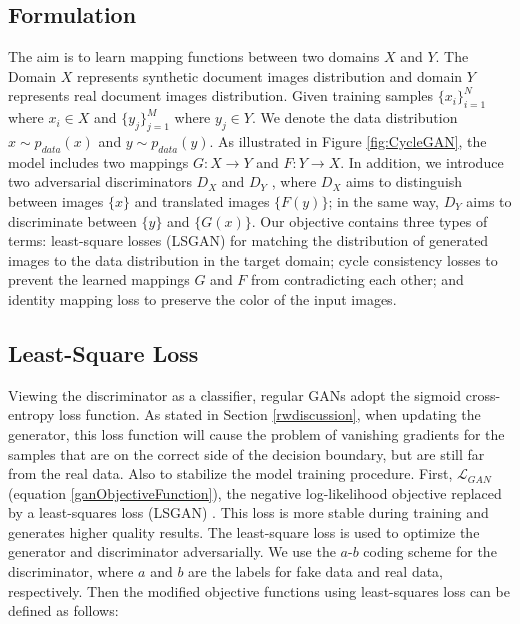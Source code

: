\subsection{Formulation}


The aim is to learn mapping functions between two domains $X$ and $Y$. The Domain $X$ represents synthetic document images distribution and domain $Y$ represents real document images distribution. Given training samples $\{x_i\}_{i=1}^{N}$ where $x_i \in X$ and  $\{y_j\}_{j=1}^{M}$ where $y_j \in Y$. We denote the data distribution $x \sim p_{data}(x)$  and $y \sim p_{data}(y)$. As illustrated in Figure \ref{fig:CycleGAN}, the model includes two mappings $G : X \rightarrow Y$ and $F : Y \rightarrow X$. In addition, we introduce two adversarial discriminators $D_X$ and $D_Y$ , where $D_X$ aims to distinguish between images $\{x\}$ and translated images $\{F(y)\}$; in the same way, $D_Y$ aims to discriminate between $\{y\}$ and $\{G(x)\}$. Our objective contains three types of terms: least-square losses (\ac{LSGAN}) \cite{mao2017squares} for matching the distribution of generated images to the data distribution in the target domain; cycle consistency losses to prevent the learned mappings $G$ and $F$ from contradicting each other; and identity mapping loss to preserve the color of the input images.


\subsection{Least-Square Loss}

Viewing the discriminator as a classifier, regular \acp{GAN} adopt the sigmoid cross-entropy loss function. As stated in Section \ref{rwdiscussion}, when updating the generator, this loss function will cause the problem of vanishing gradients for the samples that are on the correct side of the decision boundary, but are still far from the real data. Also to stabilize the model training procedure. First, $\mathcal{L}_{GAN}$ (equation \ref{ganObjectiveFunction}), the negative log-likelihood
objective replaced by a least-squares loss (\ac{LSGAN}) \cite{mao2017squares}. This loss is more stable during training and generates higher quality results. The least-square loss is used to optimize the generator and discriminator adversarially. We use the $a$-$b$ coding scheme for the discriminator, where $a$ and $b$ are the labels for fake data and real data, respectively. Then the modified objective functions using least-squares loss can be defined as follows:




